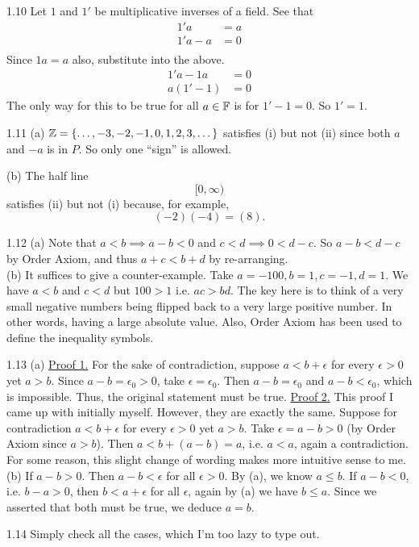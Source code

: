 1.10 Let $1$ and $1'$ be multiplicative inverses of a field. See that
\begin{align}
    1'a &= a \\
    1'a-a &=0 \\
\end{align}
Since $1a=a$ also, substitute into the above.
\begin{align}
    1'a-1a &=0 \\
    a(1'-1) &= 0
\end{align}
The only way for this to be true for all $a\in \mathbb{F}$ is for $1'-1=0$. So $1'=1$.

1.11 (a) $\mathbb{Z} = \{ \dots, -3,-2,-1,0,1,2,3, \dots \}$ satisfies (i) but not (ii) since both $a$ and $-a$ is in $P$. So only one ``sign'' is allowed.

(b) The half line \[[0,\infty)\] satisfies (ii) but not (i) because, for example, \[(-2)(-4)=(8).\]

1.12 (a) Note that $a<b \implies a-b<0$ and $c<d \implies 0<d-c$. So $a-b<d-c$ by Order Axiom, and thus $a+c<b+d$ by re-arranging.
\\(b) It suffices to give a counter-example. Take $a=-100, b=1, c=-1, d=1$. We have $a<b$ and $c<d$ but $100>1$ i.e. $ac>bd$. The key here is to think of a very small negative numbers being flipped back to a very large positive number. In other words, having a large absolute value. Also, Order Axiom has been used to define the inequality symbols.

1.13 (a) \underline{Proof 1.}  For the sake of contradiction, suppose $a<b+\epsilon$ for every $\epsilon>0$ yet $a>b$. Since $a-b=\epsilon_0>0$, take $\epsilon=\epsilon_0$. Then $a-b=\epsilon_0$ and $a-b<\epsilon_0$, which is impossible. Thus, the original statement must be true.
\underline{Proof 2.} This proof I came up with initially myself. However, they are exactly the same. Suppose for contradiction $a<b+\epsilon$ for every $\epsilon>0$ yet $a>b$. Take $\epsilon=a-b>0$ (by Order Axiom since $a>b$). Then $a<b+(a-b)=a$, i.e. $a<a$, again a contradiction. For some reason, this slight change of wording makes more intuitive sense to me. 
\\(b) If $a-b>0$. Then $a-b<\epsilon$ for all $\epsilon>0$. By (a), we know $a\leq b$. If $a-b<0$, i.e. $b-a>0$, then $b<a+\epsilon$ for all $\epsilon$, again by (a) we have $b\leq a$. Since we asserted that both must be true, we deduce $a=b$.

1.14 Simply check all the cases, which I'm too lazy to type out.

